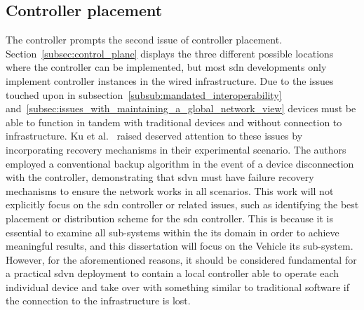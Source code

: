 \subsection{Controller placement}
The controller prompts the second issue of controller placement. Section~\ref{subsec:control_plane} displays the three different possible locations where the controller can be implemented, but most \gls{sdn} developments only implement controller instances in the wired infrastructure. Due to the issues touched upon in subsection~\ref{subsub:mandated_interoperability} and~\ref{subsec:issues_with_maintaining_a_global_network_view} devices must be able to function in tandem with traditional devices and without connection to infrastructure. 
Ku et al.~\cite{ku_towards_2014} raised deserved attention to these issues by incorporating recovery mechanisms in their experimental scenario. The authors employed a conventional backup algorithm in the event of a device disconnection with the controller, demonstrating that \gls{sdvn} must have failure recovery mechanisms to ensure the network works in all scenarios.
This work will not explicitly focus on the \gls{sdn} controller or related issues, such as identifying the best placement or distribution scheme for the \gls{sdn} controller. This is because it is essential to examine all sub-systems within the \gls{its} domain in order to achieve meaningful results, and this dissertation will focus on the Vehicle \gls{its} sub-system.
However, for the aforementioned reasons, it should be considered fundamental for a practical \gls{sdvn} deployment to contain a local controller able to operate each individual device and take over with something similar to traditional software if the connection to the infrastructure is lost. 
    

